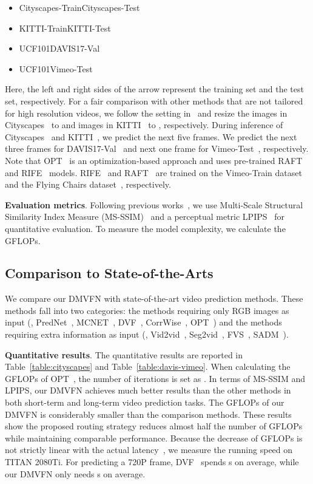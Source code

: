 \documentclass[10pt,twocolumn,letterpaper]{article}
\begin{document}
\begin{itemize}
\itemsep-0.03in
\item Cityscapes-TrainCityscapes-Test
\item KITTI-TrainKITTI-Test
\item UCF101DAVIS17-Val
\item UCF101Vimeo-Test
\end{itemize}
Here, the left and right sides of the arrow represent the training set and the test set, respectively. For a fair comparison with other methods that are not tailored for high resolution videos, we follow the setting in~\cite{fvs} and resize the images in Cityscapes~\cite{cityscapes} to  and images in KITTI~\cite{kitti} to , respectively. During inference of Cityscapes~\cite{cityscapes} and KITTI~\cite{kitti}, we predict the next five frames. We predict the next three frames for DAVIS17-Val~\cite{davis} and next one frame for Vimeo-Test~\cite{vimeo}, respectively. Note that OPT~\cite{wu2022optimizing} is an optimization-based approach and uses pre-trained RAFT~\cite{raft} and RIFE~\cite{rife} models. RIFE~\cite{rife} and RAFT~\cite{raft} are trained on the Vimeo-Train dataset~\cite{vimeo} and the Flying Chairs dataset~\cite{flownet}, respectively.

\noindent
\textbf{Evaluation metrics}. Following previous works~\cite{wu2022optimizing}, we use Multi-Scale Structural Similarity Index Measure (MS-SSIM)~\cite{msssim} and a perceptual metric LPIPS~\cite{lpips} for quantitative evaluation. To measure the model complexity, we calculate the GFLOPs.

\subsection{Comparison to State-of-the-Arts}
\label{sec:comparison}
We compare our DMVFN with state-of-the-art video prediction methods. These methods fall into two categories: the methods requiring only RGB images as input (\eg, PredNet~\cite{prednet}, MCNET~\cite{mcnet}, DVF~\cite{dvf}, CorrWise~\cite{corrwise}, OPT~\cite{wu2022optimizing}) and the methods requiring extra information as input (\eg, Vid2vid~\cite{vid2vid}, Seg2vid~\cite{seg2vid}, FVS~\cite{fvs}, SADM~\cite{sadm}). 


\noindent
\textbf{Quantitative results}. The quantitative results are reported in Table~\ref{table:cityscapes} and Table~\ref{table:davis-vimeo}. When calculating the GFLOPs of OPT~\cite{wu2022optimizing}, the number of iterations is set as . In terms of MS-SSIM and LPIPS, our DMVFN achieves much better results than the other methods in both short-term and long-term video prediction tasks. The GFLOPs of our DMVFN is considerably smaller than the comparison methods. These results show the proposed routing strategy reduces almost half the number of GFLOPs while maintaining comparable performance. Because the decrease of GFLOPs is not strictly linear with the actual latency~\cite{regnet}, we measure the running speed on TITAN 2080Ti. For predicting a 720P frame, DVF~\cite{dvf} spends s on average, while our DMVFN only needs s on average.
\end{document}
